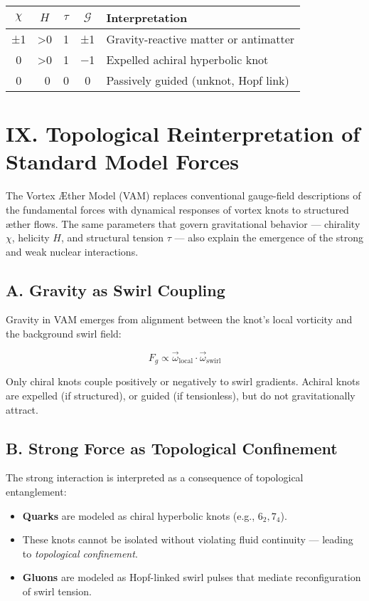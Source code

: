 \documentclass[12pt]{article}
\begin{document}
\begin{center}
\begin{tabular}{|c|c|c|c|l|}
\hline
\( \chi \) & \( H \) & \( \tau \) & \( \mathcal{G} \) & Interpretation \\
\hline
±1 & >0 & 1 & ±1 & Gravity-reactive matter or antimatter \\
0 & >0 & 1 & −1 & Expelled achiral hyperbolic knot \\
0 & ~0 & 0 & 0 & Passively guided (unknot, Hopf link) \\
\hline
\end{tabular}
\end{center}



\section*{IX. Topological Reinterpretation of Standard Model Forces}

The Vortex Æther Model (VAM) replaces conventional gauge-field descriptions of the fundamental forces with dynamical responses of vortex knots to structured æther flows. The same parameters that govern gravitational behavior — chirality \( \chi \), helicity \( H \), and structural tension \( \tau \) — also explain the emergence of the strong and weak nuclear interactions.

\subsection*{A. Gravity as Swirl Coupling}

Gravity in VAM emerges from alignment between the knot’s local vorticity and the background swirl field:

\[
F_g \propto \vec{\omega}_{\text{local}} \cdot \vec{\omega}_{\text{swirl}}
\]

Only chiral knots couple positively or negatively to swirl gradients. Achiral knots are expelled (if structured), or guided (if tensionless), but do not gravitationally attract.

\subsection*{B. Strong Force as Topological Confinement}

The strong interaction is interpreted as a consequence of topological entanglement:

\begin{itemize}
    \item \textbf{Quarks} are modeled as chiral hyperbolic knots (e.g., \( 6_2, 7_4 \)).
    \item These knots cannot be isolated without violating fluid continuity — leading to \emph{topological confinement}.
    \item \textbf{Gluons} are modeled as Hopf-linked swirl pulses that mediate reconfiguration of swirl tension.
\end{itemize}
\end{document}
